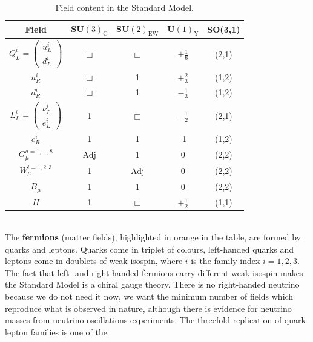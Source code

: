 \documentclass[../main.tex]{subfiles}
\begin{document}
\begin{table}[h]
        \centering
        \begin{tabular}{c|c|c|c|c}
        \hline
        \rowcolor{gray!45}Field & SU$(3)_{\text{C}}$ & SU$(2)_{\text{EW}}$ & U$(1)_{\text{Y}}$ & SO(3,1) \\
        \hline
        \cellcolor{orange!45}$Q_L^i=\begin{pmatrix}
             u_L^i\\
             d_L^i 
        \end{pmatrix}$ & \cellcolor{orange!45}$\Box$ & \cellcolor{orange!45}$\Box$ & \cellcolor{orange!45}$+\frac{1}{6}$ &\cellcolor{orange!45} (2,1) \\
        \rowcolor{orange!45}$u_R^i$ & $\Box$ & 1 & $+\frac{2}{3}$ & (1,2) \\
        \rowcolor{orange!45}$d_R^i$ & $\Box$ & 1 & $-\frac{1}{3}$ & (1,2) \\
        \hline
        \cellcolor{orange!45}$L_L^i=\begin{pmatrix}\nu_L^i\\e_L^i\end{pmatrix}$ &\cellcolor{orange!45} 1 &\cellcolor{orange!45} $\Box$ &\cellcolor{orange!45} $-\frac{1}{2}$ &\cellcolor{orange!45} (2,1) \\
        \rowcolor{orange!45}$e_R^i$ & 1 & 1 & -1 & (1,2) \\
        \hline
        \rowcolor{blue!35}$G_\mu^{a=1,\dots,8}$ & Adj & 1 & 0 & (2,2)\\
        \rowcolor{blue!35}$W_\mu^{i=1,2,3}$ & 1 & Adj & 0 & (2,2)\\
        \rowcolor{blue!35}$B_\mu$ & 1 & 1 & 0 & (2,2)\\
        \hline
        \rowcolor{purple!45}$H$ & 1 & $\Box$ & $+\frac{1}{2}$ & (1,1)\\
        \hline
        \end{tabular}
        \caption{Field content in the Standard Model.}
        \label{tab:my_label}
    \end{table}\\
The \textbf{fermions} (matter fields), highlighted in orange in the table, are formed by quarks and leptons. Quarks come in triplet of colours, left-handed quarks and leptons come in doublets of weak isospin, where $i$ is the family index $i=1,2,3$. The fact that left- and right-handed fermions carry different weak isospin makes the Standard Model is a chiral gauge theory. There is no right-handed neutrino because we do not need it now, we want the minimum number of fields which reproduce what is observed in nature, although there is evidence for neutrino masses from neutrino oscillations experiments. The threefold replication of quark-lepton families is one of the
\end{document}
